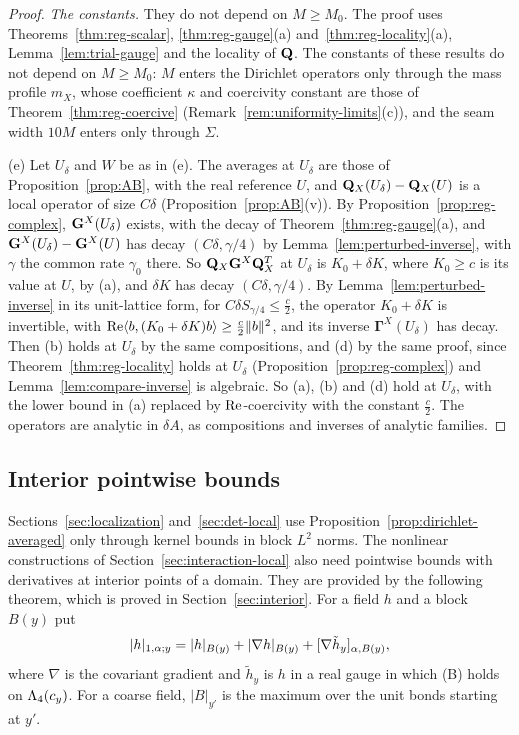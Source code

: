 \begin{proof}
\emph{The constants.} They do not depend on $M\ge M_0$. The proof uses Theorems~\ref{thm:reg-scalar}, \ref{thm:reg-gauge}(a) and~\ref{thm:reg-locality}(a), Lemma~\ref{lem:trial-gauge} and the locality of $\mathbf Q$. The constants of these results do not depend on $M\ge M_0$: $M$ enters the Dirichlet operators only through the mass profile $m_X$, whose coefficient $\kappa$ and coercivity constant are those of Theorem~\ref{thm:reg-coercive} (Remark~\ref{rem:uniformity-limits}(c)), and the seam width $10M$ enters only through $\Sigma$.

(e) Let $U_\delta$ and $W$ be as in (e). The averages at $U_\delta$ are those of Proposition~\ref{prop:AB}, with the real reference $U$, and $\mathbf Q_X(U_\delta)-\mathbf Q_X(U)$ is a local operator of size $C\delta$ (Proposition~\ref{prop:AB}(v)). By Proposition~\ref{prop:reg-complex}, $\mathbf G^X(U_\delta)$ exists, with the decay of Theorem~\ref{thm:reg-gauge}(a), and $\mathbf G^X(U_\delta)-\mathbf G^X(U)$ has decay $(C\delta,\gamma/4)$ by Lemma~\ref{lem:perturbed-inverse}, with $\gamma$ the common rate $\gamma_0$ there. So $\mathbf Q_X\mathbf G^X\mathbf Q_X^T$ at $U_\delta$ is $K_0+\delta K$, where $K_0\ge c$ is its value at $U$, by (a), and $\delta K$ has decay $(C\delta,\gamma/4)$. By Lemma~\ref{lem:perturbed-inverse} in its unit-lattice form, for $C\delta S_{\gamma/4}\le\frac c2$, the operator $K_0+\delta K$ is invertible, with $\operatorname{Re}\langle b,(K_0+\delta K)b\rangle\ge\frac c2\|b\|^2$, and its inverse $\boldsymbol\Gamma^X(U_\delta)$ has decay. Then (b) holds at $U_\delta$ by the same compositions, and (d) by the same proof, since Theorem~\ref{thm:reg-locality} holds at $U_\delta$ (Proposition~\ref{prop:reg-complex}) and Lemma~\ref{lem:compare-inverse} is algebraic. So (a), (b) and (d) hold at $U_\delta$, with the lower bound in (a) replaced by $\operatorname{Re}$-coercivity with the constant $\frac c2$. The operators are analytic in $\delta\!A$, as compositions and inverses of analytic families.
\end{proof}


\subsection{Interior pointwise bounds}\label{ss:35.3}

Sections~\ref{sec:localization} and~\ref{sec:det-local} use Proposition~\ref{prop:dirichlet-averaged} only through kernel bounds in block $L^2$ norms. The nonlinear constructions of Section~\ref{sec:interaction-local} also need pointwise bounds with derivatives at interior points of a domain. They are provided by the following theorem, which is proved in Section~\ref{sec:interior}. For a field $h$ and a block $B(y)$ put
\[
|h|_{1,\alpha;y}=|h|_{B(y)}+|\nabla h|_{B(y)}+[\nabla\tilde h_y]_{\alpha,B(y)},
\]
where $\nabla$ is the covariant gradient and $\tilde h_y$ is $h$ in a real gauge in which (B) holds on $\Lambda_4(c_y)$. For a coarse field, $|B|_{y'}$ is the maximum over the unit bonds starting at $y'$.

